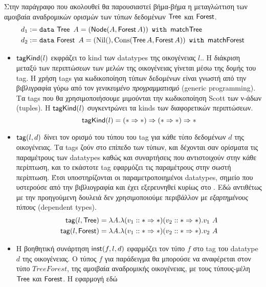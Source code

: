 Στην παράγραφο που ακολουθεί θα παρουσιαστεί βήμα-βήμα η μεταγλώττιση των
αμοιβαία αναδρομικών ορισμών των τύπων δεδομένων $\Tree$ και $\Forest$.
%
\begin{align*} d_1 &\defeq \datatype{\Tree}{A}{\textsf{matchTree}}{(\Node (A,
\Forest A))}\\ d_2 &\defeq
\datatype{\Forest}{A}{\textsf{matchForest}}{(\NNil(), \CCons(\Tree A, \Forest
A))} \end{align*} \begin{itemize} \item $\tagKind{l}$ εκφράζει το kind των
      datatypes της οικογένειας $l$.. Η διάκριση μεταξύ των περιπτώσεων των
      μελών της οικογένειας γίνεται μέσω της δομής του tag. Η χρήση tags για
      κωδικοποίηση τύπων δεδομένων είναι γνωστή από την βιβλιγραφία γύρω από
      τον \emph{γενικευμένο προγραμματισμό} (generic programming). Τα tags που
      θα χρησιμοποιήσουμε μιμούνται την κωδικοποίηση Scott των ν-άδων (tuples).
      Η $\tagKind{l}$ συγκεντρώνει τα kinds των διαφορετικών περιπτώσεων.
    $$\tagKind{l} = (\Type \kindArrow \Type) \kindArrow (\Type \kindArrow
  \Type) \kindArrow \Type$$ \item $\dtTag{l}{d}$ δίνει τον ορισμό του τύπου του
    tag για κάθε τύπο δεδομένων $d$ της οικογένειας.  Τα tags ζούν στο επίπεδο
    των τύπων, και δέχονται σαν ορίσματα τις παραμέτρους των datatypes καθώς
    και συναρτήσεις που αντιστοιχούν στην κάθε περίπτωση, και το εκάστοτε tag
    εφαρμόζει τις παραμέτρους στην σωστή περίπτωση. Έτσι υποστηρίζονται οι
    παραμετροποιημένοι datatypes, σημείο που υστερούσε από την βιβλιογραφία και
    έχει εξερευνηθεί κυρίως στο \cite{genericwithindexed}. Εδώ αντιθέτως με την
    προηγούμενη δουλειά δεν χρησιμοποιούμε περιβάλλον με \emph{εξαρτημένους
    τύπους} (dependent types).
%   
    \begin{align*} \dtTag{l}{\Tree} &= \lambda A . \lambda (v_1 :: \Type
      \kindArrow \Type) (v_2 :: \Type \kindArrow \Type) . v_1\ A\\
      \dtTag{l}{\Forest} &= \lambda A . \lambda (v_1 :: \Type \kindArrow \Type)
      (v_2 :: \Type \kindArrow \Type) . v_2\ A \end{align*} \item Η βοηθητική
        συνάρτηση $\dtInst{f}{l}{d}$ εφαρμόζει τον τύπο $f$ στο tag του
        datatype $d$ της οικογένειας. Ο τύπος $f$ για παράδειγμα θα μπορούσε να
        αναφέρεται στον τύπο $TreeForest$, της αμοιβαία αναδρομικής
        οικογένειας, με τους τύπους-μέλη $\Tree$ και $\Forest$.  Η εφαρμογή εδώ

\end{itemize}
